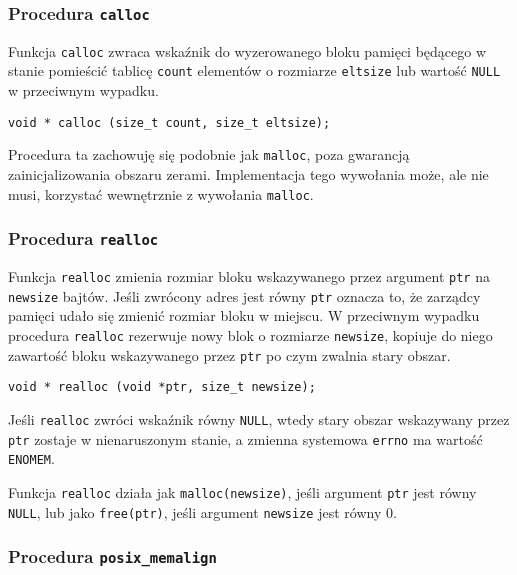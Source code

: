 \documentclass[12pt,a4paper,titlepage,twoside]{mwart}
\begin{document}
\subsubsection{Procedura \texttt{calloc}}

Funkcja \texttt{calloc} zwraca wskaźnik do wyzerowanego bloku pamięci będącego
w stanie pomieścić tablicę \texttt{count} elementów o rozmiarze
\texttt{eltsize} lub wartość \texttt{NULL} w przeciwnym wypadku.

\vspace{2ex}
\begin{lstlisting}[caption={Prototyp procedury \texttt{calloc}.}]
void * calloc (size_t count, size_t eltsize);
\end{lstlisting}

Procedura ta zachowuję się podobnie jak \texttt{malloc}, poza gwarancją
zainicjalizowania obszaru zerami. Implementacja tego wywołania może, ale nie
musi, korzystać wewnętrznie z wywołania \texttt{malloc}.

\subsubsection{Procedura \texttt{realloc}}

Funkcja \texttt{realloc} zmienia rozmiar bloku wskazywanego przez argument
\texttt{ptr} na \texttt{newsize} bajtów. Jeśli zwrócony adres jest równy
\texttt{ptr} oznacza to, że zarządcy pamięci udało się zmienić rozmiar bloku w
miejscu. W przeciwnym wypadku procedura \texttt{realloc} rezerwuje nowy blok o
rozmiarze \texttt{newsize}, kopiuje do niego zawartość bloku wskazywanego przez
\texttt{ptr} po czym zwalnia stary obszar.

\vspace{2ex}
\begin{lstlisting}[caption={Prototyp procedury \texttt{realloc}.}]
void * realloc (void *ptr, size_t newsize);
\end{lstlisting}

Jeśli \texttt{realloc} zwróci wskaźnik równy \texttt{NULL}, wtedy stary obszar
wskazywany przez \texttt{ptr} zostaje w nienaruszonym stanie, a zmienna
systemowa \texttt{errno} ma wartość \texttt{ENOMEM}.

Funkcja \texttt{realloc} działa jak \texttt{malloc(newsize)}, jeśli argument
\texttt{ptr} jest równy \texttt{NULL}, lub jako \texttt{free(ptr)}, jeśli
argument \texttt{newsize} jest równy $0$.

\subsubsection{Procedura \texttt{posix\_memalign}}
\end{document}
